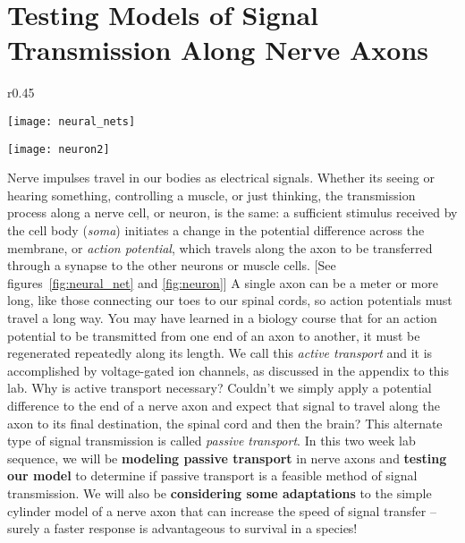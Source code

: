 \chapter{Testing Models of Signal Transmission Along Nerve Axons}
\thispagestyle{fancy}

\begin{wrapfigure}{r}{0.45\textwidth}
  \vspace{-25pt}  
  \begin{center}
  \texttt{[image: neural\_nets]}
  \end{center}
  \caption{Neurons form networks for information flow.}
  \label{fig:neural_net}
  \vspace{45pt}
  \begin{center}
  \texttt{[image: neuron2]}
  \end{center}
  \caption{Information flow through neurons.}
  \label{fig:neuron}
  \vspace{0pt}
\end{wrapfigure}

Nerve impulses travel in our bodies as electrical signals. 
Whether its seeing or hearing something, controlling a muscle, or just thinking, the transmission process along a nerve cell, or neuron, is the same: a sufficient stimulus received by the cell body (\emph{soma}) initiates a change in the potential difference across the membrane, or \emph{action potential}, which travels along the axon to be transferred through a synapse to the other neurons or muscle cells. 
[See figures~\ref{fig:neural_net} and \ref{fig:neuron}]
A single axon can be a meter or more long, like those connecting our toes to our spinal cords, so action potentials must travel a long way.
You may have learned in a biology course that for an action potential to be transmitted from one end of an axon to another, it must be regenerated repeatedly along its length.
We call this \emph{active transport} and it is accomplished by voltage-gated ion channels, as discussed in the appendix to this lab.
Why is active transport necessary?
Couldn't we simply apply a potential difference to the end of a nerve axon and expect that signal to travel along the axon to its final destination, the spinal cord and then the brain?
This alternate type of signal transmission is called \emph{passive transport}. 
In this two week lab sequence, we will be \textbf{modeling passive transport} in nerve axons and \textbf{testing our model} to determine if passive transport is a feasible method of signal transmission. 
We will also be \textbf{considering some adaptations} to the simple cylinder model of a nerve axon that can increase the speed of signal transfer – surely a faster response is advantageous to survival in a species!

